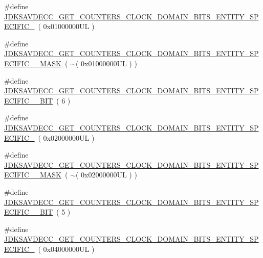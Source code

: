 \begin{DoxyCompactItemize}
\item 
\#define \hyperlink{group__get__counters__clock__domain__bits_ga01e23cb3c98c2e28dfbc58544df31e0b}{J\+D\+K\+S\+A\+V\+D\+E\+C\+C\+\_\+\+G\+E\+T\+\_\+\+C\+O\+U\+N\+T\+E\+R\+S\+\_\+\+C\+L\+O\+C\+K\+\_\+\+D\+O\+M\+A\+I\+N\+\_\+\+B\+I\+T\+S\+\_\+\+E\+N\+T\+I\+T\+Y\+\_\+\+S\+P\+E\+C\+I\+F\+I\+C\+\_}~( 0x01000000\+U\+L )
\item 
\#define \hyperlink{group__get__counters__clock__domain__bits_ga448115e6ec4f860fffde4c5e19659115}{J\+D\+K\+S\+A\+V\+D\+E\+C\+C\+\_\+\+G\+E\+T\+\_\+\+C\+O\+U\+N\+T\+E\+R\+S\+\_\+\+C\+L\+O\+C\+K\+\_\+\+D\+O\+M\+A\+I\+N\+\_\+\+B\+I\+T\+S\+\_\+\+E\+N\+T\+I\+T\+Y\+\_\+\+S\+P\+E\+C\+I\+F\+I\+C\+\_\+\_\+\+M\+A\+SK}~( $\sim$( 0x01000000\+U\+L ) )
\item 
\#define \hyperlink{group__get__counters__clock__domain__bits_ga880901d7fa30d4df39df613ebfec3e34}{J\+D\+K\+S\+A\+V\+D\+E\+C\+C\+\_\+\+G\+E\+T\+\_\+\+C\+O\+U\+N\+T\+E\+R\+S\+\_\+\+C\+L\+O\+C\+K\+\_\+\+D\+O\+M\+A\+I\+N\+\_\+\+B\+I\+T\+S\+\_\+\+E\+N\+T\+I\+T\+Y\+\_\+\+S\+P\+E\+C\+I\+F\+I\+C\+\_\+\_\+\+B\+IT}~( 6 )
\item 
\#define \hyperlink{group__get__counters__clock__domain__bits_ga9d9d9a644d209eb81951cc652e5bce9d}{J\+D\+K\+S\+A\+V\+D\+E\+C\+C\+\_\+\+G\+E\+T\+\_\+\+C\+O\+U\+N\+T\+E\+R\+S\+\_\+\+C\+L\+O\+C\+K\+\_\+\+D\+O\+M\+A\+I\+N\+\_\+\+B\+I\+T\+S\+\_\+\+E\+N\+T\+I\+T\+Y\+\_\+\+S\+P\+E\+C\+I\+F\+I\+C\+\_}~( 0x02000000\+U\+L )
\item 
\#define \hyperlink{group__get__counters__clock__domain__bits_ga34652b16818b5cf7d519ba6b77d4eead}{J\+D\+K\+S\+A\+V\+D\+E\+C\+C\+\_\+\+G\+E\+T\+\_\+\+C\+O\+U\+N\+T\+E\+R\+S\+\_\+\+C\+L\+O\+C\+K\+\_\+\+D\+O\+M\+A\+I\+N\+\_\+\+B\+I\+T\+S\+\_\+\+E\+N\+T\+I\+T\+Y\+\_\+\+S\+P\+E\+C\+I\+F\+I\+C\+\_\+\_\+\+M\+A\+SK}~( $\sim$( 0x02000000\+U\+L ) )
\item 
\#define \hyperlink{group__get__counters__clock__domain__bits_gab10eb13e1bd397dc182449de735a43a9}{J\+D\+K\+S\+A\+V\+D\+E\+C\+C\+\_\+\+G\+E\+T\+\_\+\+C\+O\+U\+N\+T\+E\+R\+S\+\_\+\+C\+L\+O\+C\+K\+\_\+\+D\+O\+M\+A\+I\+N\+\_\+\+B\+I\+T\+S\+\_\+\+E\+N\+T\+I\+T\+Y\+\_\+\+S\+P\+E\+C\+I\+F\+I\+C\+\_\+\_\+\+B\+IT}~( 5 )
\item 
\#define \hyperlink{group__get__counters__clock__domain__bits_ga2ee55b0ce95e6655951a3d3a935b8e29}{J\+D\+K\+S\+A\+V\+D\+E\+C\+C\+\_\+\+G\+E\+T\+\_\+\+C\+O\+U\+N\+T\+E\+R\+S\+\_\+\+C\+L\+O\+C\+K\+\_\+\+D\+O\+M\+A\+I\+N\+\_\+\+B\+I\+T\+S\+\_\+\+E\+N\+T\+I\+T\+Y\+\_\+\+S\+P\+E\+C\+I\+F\+I\+C\+\_}~( 0x04000000\+U\+L )

\end{DoxyCompactItemize}
